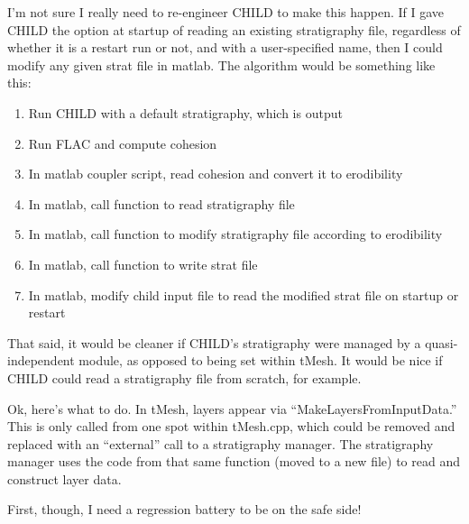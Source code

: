 \documentclass[12pt]{amsart}
\begin{document}
I'm not sure I really need to re-engineer CHILD to make this happen. If I gave CHILD the option at startup of reading an existing stratigraphy file, regardless of whether it is a restart run or not, and with a user-specified name, then I could modify any given strat file in matlab.
The algorithm would be something like this:
\begin{enumerate}
  \item Run CHILD with a default stratigraphy, which is output
  \item Run FLAC and compute cohesion
  \item In matlab coupler script, read cohesion and convert it to erodibility
  \item In matlab, call function to read stratigraphy file
  \item In matlab, call function to modify stratigraphy file according to erodibility
  \item In matlab, call function to write strat file
  \item In matlab, modify child input file to read the modified strat file on startup or restart
\end{enumerate}

That said, it would be cleaner if CHILD's stratigraphy were managed by a quasi-independent module, as opposed to being set within tMesh. It would be nice if CHILD could read a stratigraphy file from scratch, for example. 

Ok, here's what to do. In tMesh, layers appear via ``MakeLayersFromInputData.'' This is only called from one spot within tMesh.cpp, which could be removed and replaced with an ``external'' call to a stratigraphy manager. The stratigraphy manager uses the code from that same function (moved to a new file) to read and construct layer data.

First, though, I need a regression battery to be on the safe side!
\end{document}
